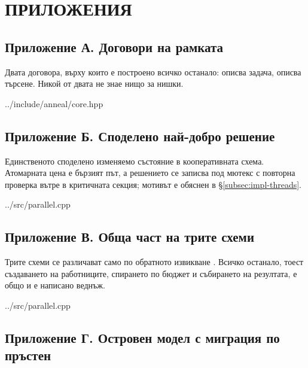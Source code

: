 \section*{ПРИЛОЖЕНИЯ}
\label{sec:appendix}

\subsection*{Приложение А. Договори на рамката}

Двата договора, върху които е построено всичко останало:  описва задача,
 описва търсене. Никой от двата не знае нищо за нишки.

%
{../include/anneal/core.hpp}

\subsection*{Приложение Б. Споделено най-добро решение}

Единственото споделено изменяемо състояние в кооперативната схема. Атомарната цена е
бързият път, а решението се записва под мютекс с повторна проверка вътре в критичната
секция; мотивът е обяснен в §\ref{subsec:impl-threads}.

%
{../src/parallel.cpp}

\subsection*{Приложение В. Обща част на трите схеми}

Трите схеми се различават само по обратното извикване . Всичко останало,
тоест създаването на работниците, спирането по бюджет и събирането на резултата, е общо
и е написано веднъж.

%
{../src/parallel.cpp}

\subsection*{Приложение Г. Островен модел с миграция по пръстен}

